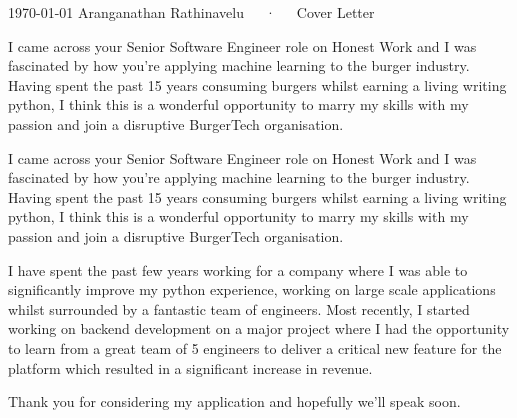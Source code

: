 \documentclass[11pt, a4paper]{awesome-cv}
\begin{document}
\makecvheader[R]
\makecvfooter
  {\today}
  {Aranganathan Rathinavelu~~~·~~~Cover Letter}
  {}
\begin{cvletter}

I came across your Senior Software Engineer role on Honest Work and I was fascinated by how you’re applying machine learning to the burger industry. Having spent the past 15 years consuming burgers whilst earning a living writing python, I think this is a wonderful opportunity to marry my skills with my passion and join a disruptive BurgerTech organisation.

I came across your Senior Software Engineer role on Honest Work and I was fascinated by how you’re applying machine learning to the burger industry. Having spent the past 15 years consuming burgers whilst earning a living writing python, I think this is a wonderful opportunity to marry my skills with my passion and join a disruptive BurgerTech organisation.

I have spent the past few years working for a company where I was able to significantly improve my python experience, working on large scale applications whilst surrounded by a fantastic team of engineers. Most recently, I started working on backend development on a major project where I had the opportunity to learn from a great team of 5 engineers to deliver a critical new feature for the platform which resulted in a significant increase in revenue.

Thank you for considering my application and hopefully we’ll speak soon.
\end{cvletter}
\makeletterclosing
\end{document}
